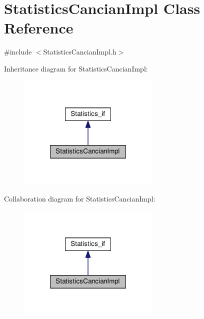 \hypertarget{class_statistics_cancian_impl}{\section{Statistics\-Cancian\-Impl Class Reference}
\label{class_statistics_cancian_impl}
}


{\ttfamily \#include $<$Statistics\-Cancian\-Impl.\-h$>$}



Inheritance diagram for Statistics\-Cancian\-Impl\-:\nopagebreak
\begin{figure}[H]
\begin{center}
\leavevmode
\includegraphics[width=192pt]{class_statistics_cancian_impl__inherit__graph}
\end{center}
\end{figure}


Collaboration diagram for Statistics\-Cancian\-Impl\-:\nopagebreak
\begin{figure}[H]
\begin{center}
\leavevmode
\includegraphics[width=192pt]{class_statistics_cancian_impl__coll__graph}
\end{center}
\end{figure}
